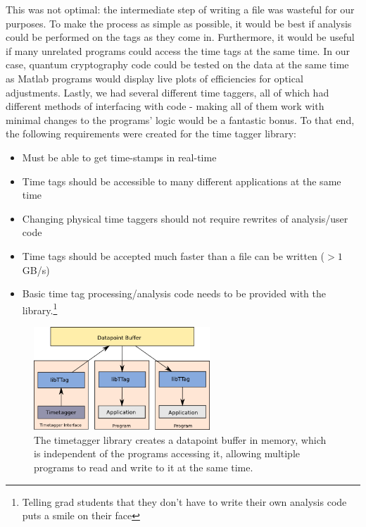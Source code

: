 \documentclass[10pt]{article}
\begin{document}
This was not optimal: the intermediate step of writing a file was wasteful for our purposes.
To make the process as simple as possible, it would be best if analysis could be performed on the tags as they come in.
Furthermore, it would be useful if many unrelated programs could access the time tags at the same time. In our case, quantum
cryptography code could be tested on the data at the same time as Matlab programs would display live plots of efficiencies for
optical adjustments. Lastly, we had
several different time taggers, all of which had different methods of interfacing with code - making all of them work with minimal
changes to the programs' logic would be a fantastic bonus. To that end, the following requirements were created for the time tagger library:

\begin{itemize}
  \item Must be able to get time-stamps in real-time
  \item Time tags should be accessible to many different applications at the same time
  \item Changing physical time taggers should not require rewrites of analysis/user code
  \item Time tags should be accepted much faster than a file can be written ($>1$ GB/s)
  \item Basic time tag processing/analysis code needs to be provided with the library.\footnote{Telling grad students that they don't have to write their own analysis code puts a smile on their face}
\end{itemize}

\begin{figure}
\begin{center}
\includegraphics[width=250px]{libttag.png}
\caption{The timetagger library creates a datapoint buffer in memory, which is independent of the programs accessing it, allowing multiple programs to read and write to it at the same time.}
\label{fig:libttag}
\end{center}
\end{figure}
\end{document}
